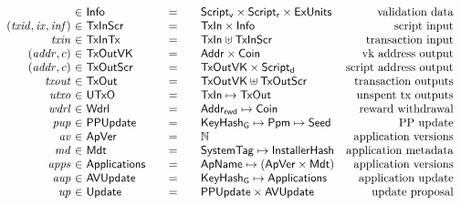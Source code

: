 \begin{figure*}[htb]
\begin{equation*}
\begin{array}{r@{~\in~}l@{\qquad=\qquad}lr}
      & \Info
      & \ScriptV \times \ScriptR \times \ExUnits
      & \text{validation data}
      \\
      (\var{txid}, \var{ix}, \var{inf})
      & \type{TxInScr}
      & \TxIn \times \Info
      & \text{script input}
      \\
      \var{txin}
      & \TxInTx
      & \TxIn \uniondistinct \TxInScr
      & \text{transaction input}
      \\
      (\var{addr}, c)
      & \type{TxOutVK}
      & \Addr \times \Coin
      & \text{vk address output}
      \\
      (\var{addr}, c)
      & \type{TxOutScr}
      & \type{TxOutVK} \times \ScriptD
      & \text{script address output}
      \\
      \var{txout}
      & \TxOut
      & \TxOutVK \uniondistinct \TxOutScr
      & \text{transaction outputs}
      \\
      \var{utxo}
      & \UTxO
      & \TxIn \mapsto \TxOut
      & \text{unspent tx outputs}
      \\
      \var{wdrl}
      & \Wdrl
      & \AddrRWD \mapsto \Coin
      & \text{reward withdrawal}
      \\
      \var{pup}
      & \PPUpdate
      & \KeyHashGen \mapsto \Ppm \mapsto \Seed
      & \text{PP update}
      \\
      \var{av}
      & \ApVer
      & \N
      & \text{application versions}
      \\
      \var{md}
      & \Metadata
      & \SystemTag\mapsto\InstallerHash
      & \text{application metadata}
      \\
      \var{apps}
      & \Applications
      & \ApName \mapsto (\ApVer \times \Metadata)
      & \text{application versions}
      \\
      \var{aup}
      & \AVUpdate
      & \KeyHashGen \mapsto \Applications
      & \text{application update}
      \\
      \var{up}
      & \Update
      & \PPUpdate \times \AVUpdate
      & \text{update proposal}
    \end{array}
  \end{equation*}
  \label{fig:defs:utxo-shelley-1}
\end{figure*}

